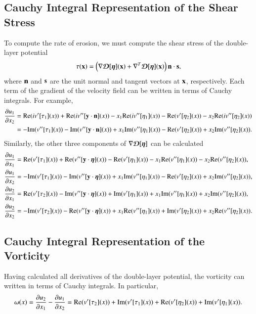 \documentclass[preprint, 10pt]{elsarticle}
\begin{document}
\subsection{Cauchy Integral Representation of the Shear Stress}
To compute the rate of erosion, we must compute the shear stress of the
double-layer potential
\begin{align}
  \tau(\xx) = \left(\nabla \DDD[\eeta](\xx) + 
    \nabla^T \DDD[\eeta](\xx) \right) \nn \cdot \ss,
\end{align} where $\nn$ and $\ss$ are the unit normal and tangent
vectors at $\xx$, respectively.  Each term of the gradient of the
velocity field can be written in terms of Cauchy integrals.  For
example,
\begin{align}
  \pderiv{u_1}{x_2} &= \Re(iv'[\tau_1](x)) + 
      \Re(i v''[\yy \cdot \nn](x)) -
      x_1\Re(i v''[\eta_1](x))  -
      \Re(v'[\eta_2](x)) - x_2 \Re(iv''[\eta_2](x)) \\
    &= -\Im(v''[\tau_1](x)) - 
      \Im(v''[\yy \cdot \nn](x)) +
      x_1\Im(v''[\eta_1](x)) -
      \Re(v'[\eta_2](x)) + x_2 \Im(v''[\eta_2](x)).
\end{align}
Similarly, the other three components of $\nabla \DDD[\eeta]$ can be
calculated
\begin{align}
  \pderiv{u_1}{x_1} &= \Re (v'[\tau_1](x)) + 
    \Re (v''[\yy\cdot\eeta](x)) - \Re (v'[\eta_1](x)) - 
    x_1\Re (v''[\eta_1](x)) - x_2\Re (v''[\eta_2](x)), \\
  \pderiv{u_1}{x_2} &= - \Im (v'[\tau_1](x)) - 
    \Im (v''[\yy\cdot\eeta](x)) + x_1\Im (v''[\eta_1](x)) - 
    \Re (v'[\eta_2](x)) + x_2\Im (v''[\eta_2](x)), \\
  \pderiv{u_2}{x_1} &= \Re (v'[\tau_2](x)) - 
    \Im (v''[\yy\cdot\eeta](x)) + \Im (v'[\eta_1](x)) +
    x_1\Im (v''[\eta_1](x)) + x_2\Im (v''[\eta_2](x)), \\
  \pderiv{u_2}{x_2} &= -\Im (v'[\tau_2](x)) - 
    \Re (v''[\yy\cdot\eeta](x)) + x_1\Re (v''[\eta_1](x)) +
    \Im (v'[\eta_2](x)) + x_2\Re (v''[\eta_2](x)).
\end{align}

\subsection{Cauchy Integral Representation of the Vorticity}
Having calculated all derivatives of the double-layer potential, the
vorticity can written in terms of Cauchy integrals.  In particular,
\begin{align}
  \omega(x) = \pderiv{u_2}{x_1} - \pderiv{u_1}{x_2} = 
\Re (v'[\tau_2](x)) + \Im (v'[\tau_1](x)) 
 + \Re (v'[\eta_2](x))+ \Im (v'[\eta_1](x)).
\end{align}
\end{document}
